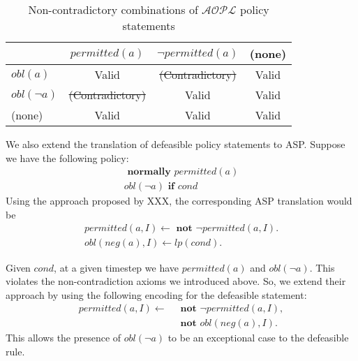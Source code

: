 \begin{table}[h]
    \centering
    \begin{tabular}{ | l | c | c | c | }
        \hline
        & $permitted(a)$ & $\neg permitted(a)$ & (none) \\
        \hline
        $obl(a)$ & Valid & \sout{(Contradictory)} & Valid \\
        \hline
        $obl(\neg a)$ & \sout{(Contradictory)} & Valid & Valid \\
        \hline
        (none) & Valid & Valid & Valid \\
        \hline
    \end{tabular}
    \caption{Non-contradictory combinations of $\mathcal{AOPL}$ policy statements}
    \label{table:apia_non_contradiction}
\end{table}

We also extend the translation of defeasible policy statements to ASP.
Suppose we have the following policy:
\begin{gather}
    \textbf{ normally } permitted(a) \\
    obl(\neg a) \textbf{ if } cond
\end{gather}
Using the approach proposed by XXX, the corresponding ASP translation would be
\begin{gather}
    permitted(a, I) \leftarrow \textbf{ not } \neg permitted(a, I). \\
    obl(neg(a), I) \leftarrow lp(cond).
\end{gather}

Given $cond$, at a given timestep we have $permitted(a)$ and $obl(\neg a)$.
This violates the non-contradiction axioms we introduced above.
So, we extend their approach by using the following encoding for the defeasible statement:
\begin{equation}
\begin{split}
    permitted(a, I) \leftarrow \
        & \textbf{ not } \neg permitted(a, I), \\
        & \textbf{ not } obl(neg(a), I).
\end{split}
\end{equation}
This allows the presence of $obl(\neg a)$ to be an exceptional case to the defeasible rule.

